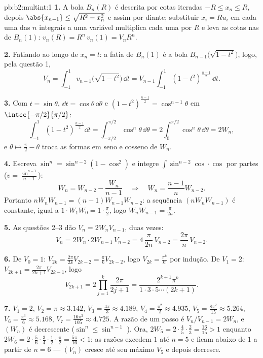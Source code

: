 \begin{solution}{pb:b2:multint:1}
\textbf{1.} A bola $B_n(R)$ é descrita por cotas iteradas
$-R \leq x_n \leq R$, depois $\abs{x_{n-1}} \leq \sqrt{R^2 -
x_n^2}$ e assim por diante; substituir $x_i = Ru_i$ em cada uma das
$n$ integrais a uma variável multiplica cada uma por $R$ e leva
as cotas nas de $B_n(1)$: $v_n(R) = R^n\,v_n(1) =
V_nR^n$.

\textbf{2.} Fatiando ao longo de $x_n = t$: a fatia de $B_n(1)$ é
a bola $B_{n-1}\bigl(\sqrt{1 - t^2}\bigr)$, logo, pela questão
1,
\[
V_n = \int_{-1}^1 v_{n-1}\bigl(\sqrt{1 - t^2}\bigr)\,\dd t
= V_{n-1}\int_{-1}^{1}(1 - t^2)^{\frac{n-1}2}\,\dd t .
\]

\textbf{3.} Com $t = \sin\theta$, $\dd t =
\cos\theta\,\dd\theta$ e $(1 - t^2)^{\frac{n-1}2} =
\cos^{n-1}\theta$ em $\intcc{-\pi/2}{\pi/2}$:
\[
\int_{-1}^1(1 - t^2)^{\frac{n-1}2}\dd t
= \int_{-\pi/2}^{\pi/2}\cos^n\theta\,\dd\theta
= 2\int_0^{\pi/2}\cos^n\theta\,\dd\theta = 2W_n,
\]
e $\theta \mapsto \frac\pi2 - \theta$ troca as formas em seno e
cosseno de $W_n$.

\textbf{4.} Escreva $\sin^n = \sin^{n-2}(1 - \cos^2)$ e
integre $\int\sin^{n-2}\cos\cdot\cos$ por partes ($v =
\frac{\sin^{n-1}}{n-1}$):
\[
W_n = W_{n-2} - \frac{W_n}{n-1}
\quad\Longrightarrow\quad
W_n = \frac{n-1}{n}W_{n-2}.
\]
Portanto $nW_nW_{n-1} = (n-1)W_{n-1}W_{n-2}$: a sequência
$(nW_nW_{n-1})$ é constante, igual a $1\cdot W_1W_0 =
1\cdot\frac\pi2$, logo $W_nW_{n-1} = \frac{\pi}{2n}$.

\textbf{5.} As questões 2--3 dão $V_n = 2W_nV_{n-1}$, duas vezes:
\[
V_n = 2W_n\cdot 2W_{n-1}\,V_{n-2}
= 4\,\frac{\pi}{2n}\,V_{n-2} = \frac{2\pi}n\,V_{n-2}.
\]

\textbf{6.} De $V_0 = 1$: $V_{2k} = \frac{2\pi}{2k}V_{2k-2}
= \frac\pi kV_{2k-2}$, logo $V_{2k} = \frac{\pi^k}{k!}$ por
indução. De $V_1 = 2$: $V_{2k+1} =
\frac{2\pi}{2k+1}V_{2k-1}$, logo
\[
V_{2k+1} = 2\prod_{j=1}^k\frac{2\pi}{2j+1}
= \frac{2^{k+1}\pi^k}{1\cdot3\cdot5\cdots(2k+1)} .
\]

\textbf{7.} $V_1 = 2$, $V_2 = \pi \approx 3.142$, $V_3 =
\frac{4\pi}3 \approx 4.189$, $V_4 = \frac{\pi^2}2 \approx
4.935$, $V_5 = \frac{8\pi^2}{15} \approx 5.264$, $V_6 =
\frac{\pi^3}6 \approx 5.168$, $V_7 = \frac{16\pi^3}{105}
\approx 4.725$. A razão de um passo é $V_n/V_{n-1} = 2W_n$,
e $(W_n)$ é decrescente ($\sin^n \leq \sin^{n-1}$
). Ora, $2W_5 = 2\cdot\frac45\cdot\frac23 =
\frac{16}{15} > 1$ enquanto $2W_6 =
2\cdot\frac56\cdot\frac34\cdot\frac12\cdot\frac\pi2 =
\frac{5\pi}{16} < 1$: as razões excedem $1$ até $n = 5$ e
ficam abaixo de $1$ a partir de $n = 6$ --- $(V_n)$ cresce até seu
máximo $V_5$ e depois decresce.


\end{solution}
